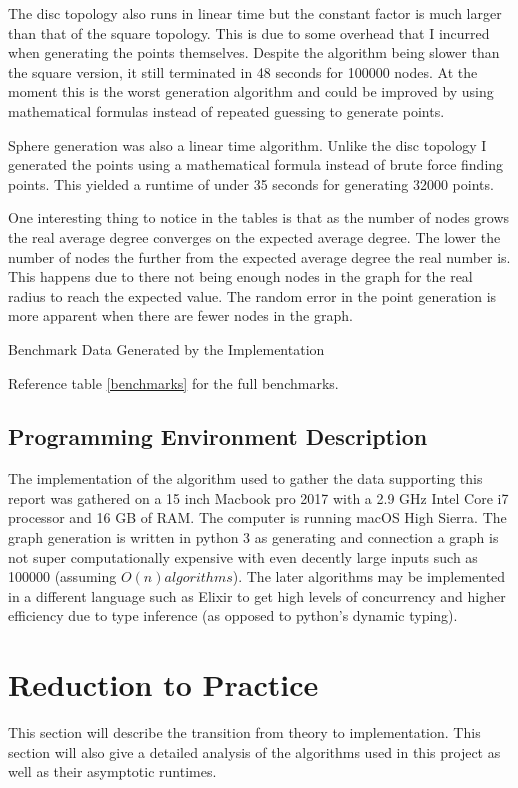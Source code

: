 \documentclass{article}
\begin{document}
	The disc topology also runs in linear time but the constant factor is much larger than that of the square topology.
	This is due to some overhead that I incurred when generating the points themselves.
	Despite the algorithm being slower than the square version, it still terminated in 48 seconds for 100000 nodes.
  At the moment this is the worst generation algorithm and could be improved by using mathematical formulas instead of repeated guessing to generate points.

  Sphere generation was also a linear time algorithm.
  Unlike the disc topology I generated the points using a mathematical formula instead of brute force finding points.
  This yielded a runtime of under 35 seconds for generating 32000 points.

	One interesting thing to notice in the tables is that as the number of nodes grows the real average degree converges on the expected average degree.
	The lower the number of nodes the further from the expected average degree the real number is.
	This happens due to there not being enough nodes in the graph for the real radius to reach the expected value.
  The random error in the point generation is more apparent when there are fewer nodes in the graph.

  \begin{table}
    \centering
    \label{benchmarks}
    \caption{Benchmark Data Generated by the Implementation}
  \end{table}

  Reference table \ref{benchmarks} for the full benchmarks.

  \subsection{Programming Environment Description}
		The implementation of the algorithm used to gather the data supporting this report was gathered on a 15 inch Macbook pro 2017 with a 2.9 GHz Intel Core i7 processor and 16 GB of RAM.
		The computer is running macOS High Sierra.
		The graph generation is written in python 3 as generating and connection a graph is not super computationally expensive with even decently large inputs such as 100000 (assuming $O(n) algorithms$).
		The later algorithms may be implemented in a different language such as Elixir to get high levels of concurrency and higher efficiency due to type inference (as opposed to python's dynamic typing).
  \section{Reduction to Practice}
    This section will describe the transition from theory to implementation.
    This section will also give a detailed analysis of the algorithms used in this project as well as their asymptotic runtimes.
\end{document}
